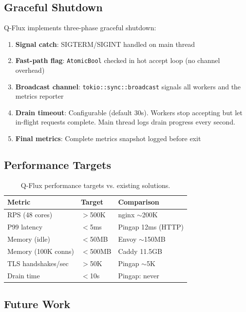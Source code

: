 \documentclass[11pt,a4paper,twocolumn]{article}
\begin{document}
\subsection{Graceful Shutdown}

Q-Flux implements three-phase graceful shutdown:

\begin{enumerate}[nosep]
\item \textbf{Signal catch}: SIGTERM/SIGINT handled on main thread
\item \textbf{Fast-path flag}: \texttt{AtomicBool} checked in hot accept loop (no channel overhead)
\item \textbf{Broadcast channel}: \texttt{tokio::sync::broadcast} signals all workers and the metrics reporter
\item \textbf{Drain timeout}: Configurable (default 30s). Workers stop accepting but let in-flight requests complete. Main thread logs drain progress every second.
\item \textbf{Final metrics}: Complete metrics snapshot logged before exit
\end{enumerate}

\subsection{Performance Targets}

\begin{table}[H]
\centering
\footnotesize
\begin{tabular}{lll}
\toprule
\textbf{Metric} & \textbf{Target} & \textbf{Comparison} \\
\midrule
RPS (48 cores) & $>$500K & nginx $\sim$200K \\
P99 latency & $<$5ms & Pingap 12ms (HTTP) \\
Memory (idle) & $<$50MB & Envoy $\sim$150MB \\
Memory (100K conns) & $<$500MB & Caddy 11.5GB \\
TLS handshakes/sec & $>$50K & Pingap $\sim$5K \\
Drain time & $<$10s & Pingap: never \\
\bottomrule
\end{tabular}
\caption{Q-Flux performance targets vs. existing solutions.}
\end{table}

\subsection{Future Work}
\end{document}
